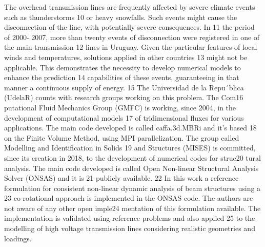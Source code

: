 \begin{foreignabstract}
The overhead transmission lines are frequently affected by severe climate events such as thunderstorms
10 or heavy snowfalls. Such events might cause the disconnection of the line, with potentially severe consequences. In
11 the period of 2000- 2007, more than twenty events of disconnection were registered in one of the main transmission
12 lines in Uruguay. Given the particular features of local winds and temperatures, solutions applied in other countries
13 might not be applicable. This demonstrates the necessity to develop numerical models to enhance the prediction
14 capabilities of these events, guaranteeing in that manner a continuous supply of energy.
15 The Universidad de la Repu´blica (UdelaR) counts with research groups working on this problem. The Com16
putational Fluid Mechanics Group (GMFC) is working, since 2004, in the development of computational models
17 of tridimensional fluxes for various applications. The main code developed is called caffa.3d.MBRi and it’s based
18 on the Finite Volume Method, using MPI parallelization. The group called Modelling and Identification in Solids
19 and Structures (MISES) is committed, since its creation in 2018, to the development of numerical codes for struc20
tural analysis. The main code developed is called Open Non-linear Structural Analysis Solver (ONSAS) and it is
21 publicly available.
22 In this work a reference formulation for consistent non-linear dynamic analysis of beam structures using a
23 co-rotational approach is implemented in the ONSAS code. The authors are not aware of any other open imple24
mentation of this formulation available. The implementation is validated using reference problems and also applied
25 to the modelling of high voltage transmission lines considering realistic geometries and loadings.

\end{foreignabstract}